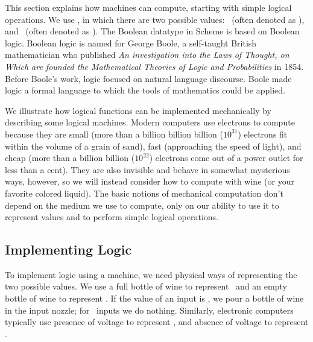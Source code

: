\begin{schemeregion}

This section explains how machines can compute, starting with simple logical operations.  We use , in which there are two possible values: \true\ (often denoted as \bI), and \false\ (often denoted as \bO).  The Boolean datatype in Scheme is based on Boolean logic.  Boolean logic is named for George Boole, a self-taught British mathematician who published {\em An investigation into the Laws of Thought, on Which are founded the Mathematical Theories of Logic and Probabilities} in 1854.  Before Boole's work, logic focused on natural language discourse.  Boole made logic a formal language to which the tools of mathematics could be applied. 

We illustrate how logical functions can be implemented mechanically by describing some logical machines.  Modern computers use electrons to compute because they are small (more than a billion billion billion ($10^{31}$) electrons fit within the volume of a grain of sand), fast (approaching the speed of light), and cheap (more than a billion billion ($10^{22}$) electrons come out of a power outlet for less than a cent).   %
They are also invisible and behave in somewhat mysterious ways, however, so we will instead consider how to compute with wine (or your favorite colored liquid).  The basic notions of mechanical computation don't depend on the medium we use to compute, only on our ability to use it to represent values and to perform simple logical operations.

\subsection{Implementing Logic}

To implement logic using a machine, we need physical ways of representing the two possible values.  We use a full bottle of wine to represent \true\ and an empty bottle of wine to represent \false.  If the value of an input is \true, we pour a bottle of wine in the input nozzle; for \false\ inputs we do nothing.  Similarly, electronic computers typically use presence of voltage to represent \true, and absence of voltage to represent \false.  


\end{schemeregion}
